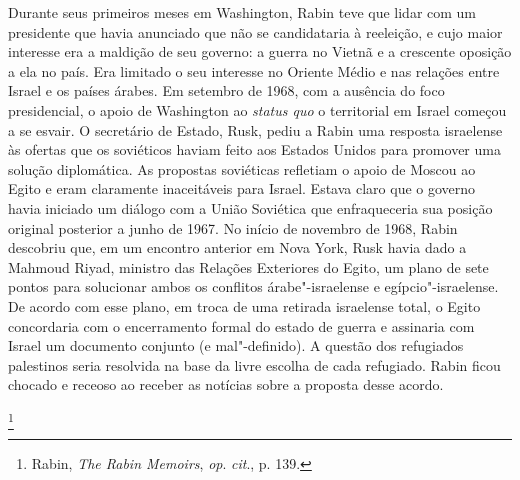 Durante seus primeiros meses em Washington, Rabin teve que lidar com um
presidente que havia anunciado que não se candidataria à reeleição, e
cujo maior interesse era a maldição de seu governo: a guerra no Vietnã e
a crescente oposição a ela no país. Era limitado o seu interesse no
Oriente Médio e nas relações entre Israel e os países árabes. Em
setembro de 1968, com a ausência do foco presidencial, o apoio de
Washington ao \textit{status quo} o territorial em Israel começou a se
esvair. O secretário de Estado, Rusk, pediu a Rabin uma resposta
israelense às ofertas que os soviéticos haviam feito aos Estados Unidos para
promover uma solução diplomática. As propostas soviéticas refletiam o
apoio de Moscou ao Egito e eram claramente inaceitáveis para Israel.
Estava claro que o governo havia iniciado um diálogo com a União
Soviética que enfraqueceria sua posição original posterior a junho de
1967. No início de novembro de 1968, Rabin descobriu que, em um encontro
anterior em Nova York, Rusk havia dado a Mahmoud Riyad, ministro das
Relações Exteriores do Egito, um plano de sete pontos para solucionar
ambos os conflitos árabe"-israelense e egípcio"-israelense. De acordo com esse
plano, em troca de uma retirada israelense total, o Egito concordaria
com o encerramento formal do estado de guerra e assinaria com Israel um
documento conjunto (e mal"-definido). A questão dos refugiados palestinos
seria resolvida na base da livre escolha de cada refugiado. Rabin ficou
chocado e receoso ao receber as notícias sobre a proposta desse acordo.

\footnote{Rabin, \textit{The Rabin Memoirs}, \textit{op}. \textit{cit}., p. 139.} 


